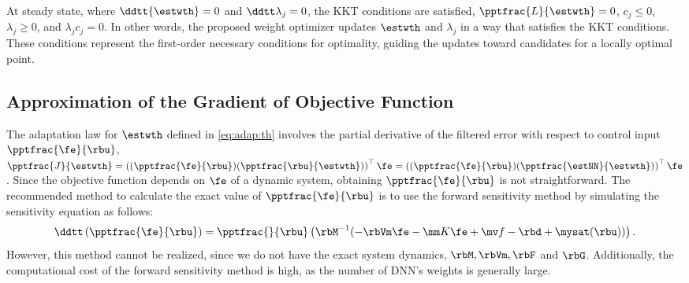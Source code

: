 \documentclass[letterpaper, journal]{IEEEtran}
\begin{document}
At steady state, where $\ddtt{\estwth}=0$ and $\ddtt\lambda_j=0$, the KKT conditions are satisfied, \ie $\pptfrac{L}{\estwth}=0$, $c_j \le 0$, $\lambda_j \ge 0$, and $\lambda_j c_j=0$.
In other words, the proposed weight optimizer updates $\estwth$ and $\lambda_j$ in a way that satisfies the KKT conditions. 
These conditions represent the first-order necessary conditions for optimality, guiding the updates toward candidates for a locally optimal point.

\subsection{Approximation of the Gradient of Objective Function}

The adaptation law for $\estwth$ defined in \eqref{eq:adap:th} involves the partial derivative of the filtered error with respect to control input $\pptfrac{\fe}{\rbu}$, \ie 
$
    \pptfrac{J}{\estwth}
    =
    \left(
        (\pptfrac{\fe}{\rbu})
        (\pptfrac{\rbu}{\estwth})
    \right)
    ^\top \fe
    =
    \left(
        (\pptfrac{\fe}{\rbu})
        (\pptfrac{\estNN}{\estwth})
    \right)
    ^\top \fe
$. 
Since the objective function depends on $\fe$ of a dynamic system, obtaining $\pptfrac{\fe}{\rbu}$ is not straightforward. 
The recommended method to calculate the exact value of $\pptfrac{\fe}{\rbu}$ is to use the forward sensitivity method \cite{Sengupta:2014aa,Ryu:2024aa} by simulating the sensitivity equation as follows: 
\begin{equation}
    \ddtt 
    \left(
        \pptfrac{\fe}{\rbu}
    \right)
    =
    \pptfrac{}{
        \rbu
    }
    \left(
        \rbM^{-1}(
            -\rbVm \fe
            -\mm K \fe
            + \mv f
            -\rbd + \mysat(\rbu)
        )
    \right)
    .
\end{equation}
However, this method cannot be realized, since we do not have the exact system dynamics, \ie $\rbM,\rbVm, \rbF$ and $ \rbG$.
Additionally, the computational cost of the forward sensitivity method is high, as the number of DNN's weights is generally large.
\end{document}
